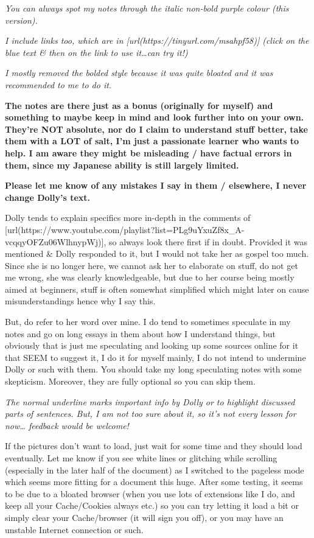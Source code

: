 {\em You can always spot my notes through the italic non-bold purple colour (this version).}

{\em I include links too, which are in [url(https://tinyurl.com/msahpf58)] (click on the blue text & then on the link to use it\ldots{}can try it!)}

{\em I mostly removed the bolded style because it was quite bloated and it was recommended to me to do it.}

{\bf The notes are there just as a bonus (originally for myself) and something to maybe keep in mind and look further into on your own. They're NOT absolute, nor do I claim to understand stuff better, take them with a LOT of salt, I'm just a passionate learner who wants to help. I am aware they might be misleading / have factual errors in them, since my Japanese ability is still largely limited.}

{\bf Please let me know of any mistakes I say in them / elsewhere, I never change Dolly's text.}

Dolly tends to explain specifics more in-depth in the comments of [url(https://www.youtube.com/playlist?list=PLg9uYxuZf8x_A-vcqqyOFZu06WlhnypWj)], so always look there first if in doubt. Provided it was mentioned & Dolly responded to it, but I would not take her as gospel too much. Since she is no longer here, we cannot ask her to elaborate on stuff, do not get me wrong, she was clearly knowledgeable, but due to her course being mostly aimed at beginners, stuff is often somewhat simplified which might later on cause misunderstandings hence why I say this.

But, do refer to her word over mine. I do tend to sometimes speculate in my notes and go on long essays in them about how I understand things, but obviously that is just me speculating and looking up some sources online for it that SEEM to suggest it, I do it for myself mainly, I do not intend to undermine Dolly or such with them. You should take my long speculating notes with some skepticism. Moreover, they are fully optional so you can skip them.

{\em The normal underline marks important info by Dolly or to highlight discussed parts of sentences. But, I am not too sure about it, so it's not every lesson for now\ldots{} feedback would be welcome!}

If the pictures don't want to load, just wait for some time and they should load eventually. Let me know if you see white lines or glitching while scrolling (especially in the later half of the document) as I switched to the pageless mode which seems more fitting for a document this huge. After some testing, it seems to be due to a bloated browser (when you use lots of extensions like I do, and keep all your Cache/Cookies always etc.) so you can try letting it load a bit or simply clear your Cache/browser (it will sign you off), or you may have an unstable Internet connection or such.

